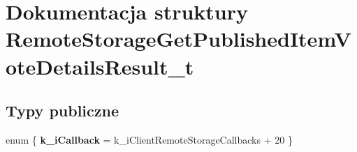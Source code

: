 \hypertarget{struct_remote_storage_get_published_item_vote_details_result__t}{}\section{Dokumentacja struktury Remote\+Storage\+Get\+Published\+Item\+Vote\+Details\+Result\+\_\+t}
\label{struct_remote_storage_get_published_item_vote_details_result__t}
\subsection*{Typy publiczne}
\begin{DoxyCompactItemize}
\item 
\mbox{\label{struct_remote_storage_get_published_item_vote_details_result__t_a76dbca2b1e8fa96655122378e5ffb03d}} 
enum \{ {\bfseries k\+\_\+i\+Callback} = k\+\_\+i\+Client\+Remote\+Storage\+Callbacks + 20
 \}
\end{DoxyCompactItemize}
